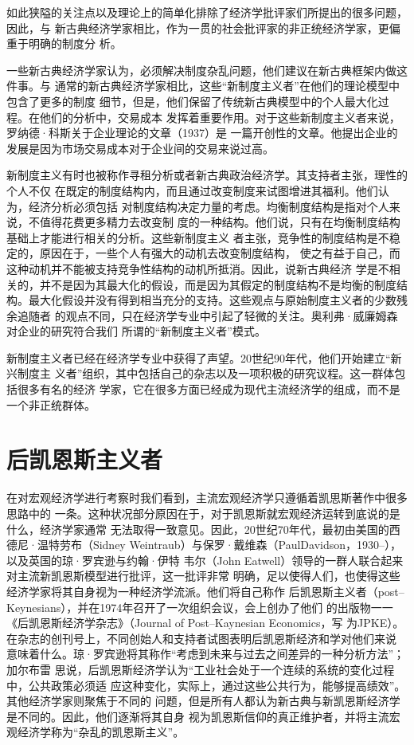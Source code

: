 如此狭隘的关注点以及理论上的简单化排除了经济学批评家们所提出的很多问题，因此，与
新古典经济学家相比，作为一贯的社会批评家的非正统经济学家，更偏重于明确的制度分
析。

一些新古典经济学家认为，必须解决制度杂乱问题，他们建议在新古典框架内做这件事。与
通常的新古典经济学家相比，这些“新制度主义者”在他们的理论模型中包含了更多的制度
细节，但是，他们保留了传统新古典模型中的个人最大化过程。在他们的分析中，交易成本
发挥着重要作用。对于这些新制度主义者来说，罗纳德·科斯关于企业理论的文章（1937）是
一篇开创性的文章。他提出企业的发展是因为市场交易成本对于企业间的交易来说过高。

新制度主义有时也被称作寻租分析或者新古典政治经济学。其支持者主张，理性的个人不仅
在既定的制度结构内，而且通过改变制度来试图增进其福利。他们认为，经济分析必须包括
对制度结构决定力量的考虑。均衡制度结构是指对个人来说，不值得花费更多精力去改变制
度的一种结构。他们说，只有在均衡制度结构基础上才能进行相关的分析。这些新制度主义
者主张，竞争性的制度结构是不稳定的，原因在于，一些个人有强大的动机去改变制度结构，
使之有益于自己，而这种动机并不能被支持竞争性结构的动机所抵消。因此，说新古典经济
学是不相关的，并不是因为其最大化的假设，而是因为其假定的制度结构不是均衡的制度结
构。最大化假设并没有得到相当充分的支持。这些观点与原始制度主义者的少数残余追随者
的观点不同，只在经济学专业中引起了轻微的关注。奥利弗·威廉姆森对企业的研究符合我们
所谓的“新制度主义者”模式。

新制度主义者已经在经济学专业中获得了声望。20世纪90年代，他们开始建立“新兴制度主
义者”组织，其中包括自己的杂志以及一项积极的研究议程。这一群体包括很多有名的经济
学家，它在很多方面已经成为现代主流经济学的组成，而不是一个非正统群体。

\section{后凯恩斯主义者}

在对宏观经济学进行考察时我们看到，主流宏观经济学只遵循着凯思斯著作中很多思路中的
一条。这种状况部分原因在于，对于凯恩斯就宏观经济运转到底说的是什么，经济学家通常
无法取得一致意见。因此，20世纪70年代，最初由美国的西德尼·温特劳布（Sidney
Weintraub）与保罗·戴维森（PaulDavidson，1930--），以及英国的琼·罗宾逊与约翰·伊特
韦尔（John Eatwell）领导的一群人联合起来对主流新凯恩斯模型进行批评，这一批评非常
明确，足以使得人们，也使得这些经济学家将其自身视为一种经济学流派。他们将自己称作
后凯恩斯主义者（post--Keynesians），并在1974年召开了一次组织会议，会上创办了他们
的出版物一一《后凯恩斯经济学杂志》（Journal of Post--Kaynesian Economics，写
为JPKE）。在杂志的创刊号上，不同创始人和支持者试图表明后凯恩斯经济和学对他们来说
意味着什么。琼·罗宾逊将其称作“考虑到未来与过去之间差异的一种分析方法”；加尔布雷
思说，后凯恩斯经济学认为“工业社会处于一个连续的系统的变化过程中，公共政策必须适
应这种变化，实际上，通过这些公共行为，能够提高绩效”。其他经济学家则聚焦于不同的
问题，但是所有人都认为新古典与新凯恩斯经济学是不同的。因此，他们逐渐将其自身
视为凯恩斯信仰的真正维护者，并将主流宏观经济学称为“杂乱的凯恩斯主义”。

